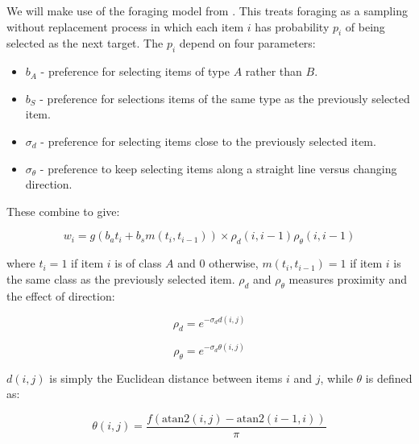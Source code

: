 \documentclass[vision,article,submit,pdftex,moreauthors]{Definitions/mdpi}
\begin{document}
We will make use of the foraging model from \cite{clarke2022}. This treats foraging as a sampling without replacement process in which each item $i$ has probability $p_i$ of being selected as the next target. The $p_i$ depend on four parameters:

\begin{itemize}
    \item $b_A$ - preference for selecting items of type $A$ rather than $B$.
    \item $b_S$ - preference for selections items of the same type as the previously selected item.
    \item $\sigma_d$ - preference for selecting items close to the previously selected item.
    \item $\sigma_{\theta}$ - preference to keep selecting items along a straight line versus changing direction.
\end{itemize}

These combine to give:

\begin{linenomath}
\begin{equation}
    w_i = g\left(b_at_i + b_sm(t_i, t_{i-1})\right) \times \rho_d(i, i-1) \rho_{\theta}(i, i-1)
\end{equation}
\end{linenomath}

where $t_i = 1$ if item $i$ is of class $A$ and 0 otherwise, $m(t_i, t_{i-1}) =1$ if item $i$ is the same class as the previously selected item. $\rho_d$ and $\rho_{\theta}$ measures proximity and the effect of direction:

\begin{linenomath}
\begin{equation}
    \rho_d = e^{-\sigma_dd(i,j)}
\end{equation}
\end{linenomath}

\begin{linenomath}
\begin{equation}
    \rho_{\theta} = e^{-\sigma_d\theta(i,j)}
\end{equation}
\end{linenomath}

$d(i,j)$ is simply the Euclidean distance between items $i$ and $j$, while $\theta$ is defined as:

\begin{linenomath}
\begin{equation}
    \theta(i,j) = \frac{f(\text{atan2}(i, j) - \text{atan2}(i-1, i))}{\pi}
\end{equation}
\end{linenomath}
\end{document}
